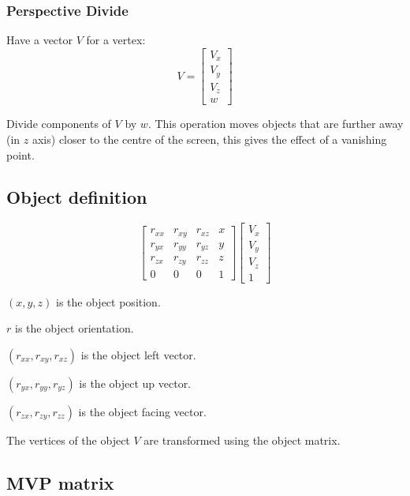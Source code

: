 \documentclass[a4paper]{article}
\begin{document}
\subsubsection{Perspective Divide}

Have a vector $V$ for a vertex:
\[
  V =
  \left [
    \begin{array}{c}
      V_{x} \\
      V_{y} \\
      V_{z} \\
      w
    \end{array}
  \right ]
\]

Divide components of $V$ by $w$. This operation moves objects that are further
away (in $z$ axis) closer to the centre of the screen, this gives the effect of
a vanishing point.

\subsection{Object definition}

\[
  \left [
    \begin{array}{cccc}
      r_{xx}  & r_{xy}  & r_{xz}  & x \\
      r_{yx}  & r_{yy}  & r_{yz}  & y \\
      r_{zx}  & r_{zy}  & r_{zz}  & z \\
      0       & 0       & 0       & 1
    \end{array}
  \right ]
  \left [
    \begin{array}{c}
      V_{x} \\
      V_{y} \\
      V_{z} \\
      1
    \end{array}
  \right ]
\]

$(x, y, z)$ is the object position.

$r$ is the object orientation.

$(r_{xx}, r_{xy}, r_{xz})$ is the object left vector.

$(r_{yx}, r_{yy}, r_{yz})$ is the object up vector.

$(r_{zx}, r_{zy}, r_{zz})$ is the object facing vector.

The vertices of the object $V$ are transformed using the object matrix.

\subsection{MVP matrix}
\end{document}
